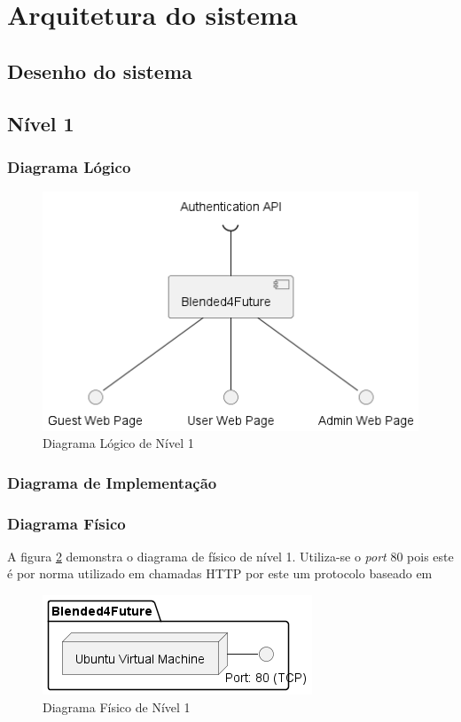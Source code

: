 \section{Arquitetura do sistema}


\subsection{Desenho do sistema}





\subsection{Nível 1}

\subsubsection{Diagrama Lógico}

\begin{figure}[h!tbp]
    \centering
    \includegraphics[width=0.5\linewidth]{capitulos/cap3-analisedoproblema/assets/arquiteturasistema/logical/logical_l1.png}
    \caption{Diagrama Lógico de Nível 1}
    \label{fig:diagram-lvl1-logical}
\end{figure}

\subsubsection{Diagrama de Implementação}

\subsubsection{Diagrama Físico} 

A figura \ref{fig:diagram-lvl1-physical} demonstra o diagrama de físico de nível 1. Utiliza-se o \textit{port} 80 pois este é por norma utilizado em chamadas \Acrshort{HTTP} por este um protocolo baseado em 

\begin{figure}[h!tbp]
    \centering
    \includegraphics[width=0.5\linewidth]{capitulos/cap3-analisedoproblema/assets/arquiteturasistema/physical/physical_l1.png}
    \caption{Diagrama Físico de Nível 1}
    \label{fig:diagram-lvl1-physical}
\end{figure}





